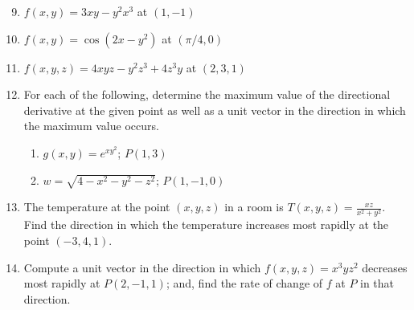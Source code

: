 \documentclass[12pt]{article}
\newif\ifans
\begin{document}

\begin{enumerate}
\setcounter{enumi}{8}

\item $f(x,y)=3xy-y^2x^3$ at $(1, -1)$ 

\ifans{\fbox{$\nabla f(1,-1)=-6\mathbf{i}+5\mathbf{j}$}} \fi

\item $f(x,y)=\cos{(2x-y^2)}$ at $(\pi/4, 0)$ 

\ifans{\fbox{$\nabla f\left(\frac{\pi}{4},0\right) = \langle-2,0\rangle$}} \fi

\item $f(x,y,z)=4xyz-y^2z^3+4z^3y$ at $(2, 3, 1)$ 

\ifans{\fbox{$\nabla f(2,3,1)= 12\mathbf{i}+6\mathbf{j}+33\mathbf{k}$}} \fi

\item For each of the following, determine the maximum value of the directional derivative at the given point as well as a unit vector in the direction in which the maximum value occurs.

\begin{enumerate}

\item $g(x,y)=e^{xy^2}$; $P(1, 3)$ 

\ifans{\fbox{\parbox{1\linewidth}{The maximum value of the directional derivative of $g$ at $P$ is $e^{9}\sqrt{117}$ which occurs in the direction of ${\bf u}=\left\langle \frac{9}{\sqrt{117}},\frac{6}{\sqrt{117}}\right\rangle$.}}} \fi

\item $w=\sqrt{4-x^2-y^2-z^2}$; $P(1, -1, 0)$ 

\ifans{\fbox{\parbox{1\linewidth}{The maximum value of the directional derivative of $w$ at $P$ is 1 which occurs in the direction of ${\bf u}=\left\langle -\frac{1}{\sqrt{2}}, \frac{1}{\sqrt{2}},0\right\rangle$.}}} \fi

\end{enumerate}

\item The temperature at the point $(x,y,z)$ in a room is $T(x,y,z)=\frac{xz}{x^2+y^2}$. Find the direction in which the temperature increases most rapidly at the point $(-3, 4,1)$.  

\ifans{\fbox{$\frac{7}{625}\mathbf{i}+\frac{24}{625}\mathbf{j}-\frac{3}{25}\mathbf{k}$}} \fi

\item Compute a unit vector in the direction in which $f(x,y,z)=x^3yz^2$ decreases most rapidly at $P(2, -1, 1)$; and, find the rate of change of $f$ at $P$ in that direction.

\ifans{\fbox{\parbox{1\linewidth}{The direction in which $f$ decreases most rapidly is ${\bf u}=\left\langle \frac{3}{\sqrt{29}},-\frac{2}{\sqrt{29}}, \frac{4}{\sqrt{29}}\right\rangle$.  And, the rate of change in this direction is $-4\sqrt{29}$.}}} \fi

\end{enumerate}
\end{document}
